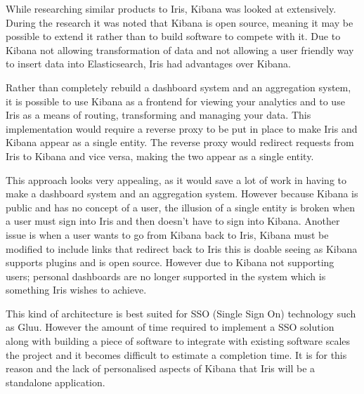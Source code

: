 \documentclass[12pt,a4paper,titlepage]{report}
\begin{document}
\begin{appendices}
While researching similar products to Iris, Kibana was looked at extensively. During the research it was noted that Kibana is open source, meaning it may be possible to extend it rather than to build software to compete with it. Due to Kibana not allowing transformation of data and not allowing a user friendly way to insert data into Elasticsearch, Iris had advantages over Kibana. 

Rather than completely rebuild a dashboard system and an aggregation system, it is possible to use Kibana as a frontend for viewing your analytics and to use Iris as a means of routing, transforming and managing your data. This implementation would require a reverse proxy to be put in place to make Iris and Kibana appear as a single entity. The reverse proxy would redirect requests from Iris to Kibana and vice versa, making the two appear as a single entity.

This approach looks very appealing, as it would save a lot of work in having to make a dashboard system and an aggregation system. However because Kibana is public and has no concept of a user, the illusion of a single entity is broken when a user must sign into Iris and then doesn’t have to sign into Kibana. Another issue is when a user wants to go from Kibana back to Iris, Kibana must be modified to include links that redirect back to Iris this is doable seeing as Kibana supports plugins and is open source. However due to Kibana not supporting users; personal dashboards are no longer supported in the system which is something Iris wishes to achieve.

This kind of architecture is best suited for SSO (Single Sign On) technology such as Gluu. However the amount of  time required to implement a SSO solution along with building a piece of software to integrate with existing software scales the project and it becomes difficult to estimate a completion time. It is for this reason and the lack of personalised aspects of Kibana that Iris will be a standalone application.


\end{appendices}
\end{document}

